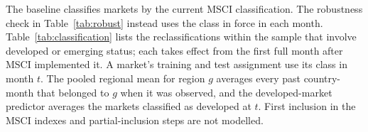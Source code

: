\documentclass[11pt]{article}
\begin{document}
The baseline classifies markets by the current MSCI classification. The robustness check in Table~\ref{tab:robust} instead uses the class in force in each month. Table~\ref{tab:classification} lists the reclassifications within the sample that involve developed or emerging status; each takes effect from the first full month after MSCI implemented it. A market's training and test assignment use its class in month $t$. The pooled regional mean for region $g$ averages every past country-month that belonged to $g$ when it was observed, and the developed-market predictor averages the markets classified as developed at $t$. First inclusion in the MSCI indexes and partial-inclusion steps are not modelled.


\end{document}
